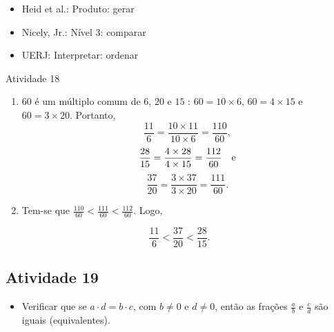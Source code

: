 \begin{multicols}{2}
   \vspace{.1cm}

 \vspace{.1cm}

\begin{itemize} %
    \item       Heid et al.: Produto: gerar
    \item       Nicely, Jr.: Nível 3: comparar
    \item       UERJ: Interpretar: ordenar
\end{itemize} %


\begin{resposta*}{Atividade 18}
\begin{enumerate} [\quad a)] %
    \item             $60$       é um múltiplo comum de       $6$,       $20$
   e       $15$      :       $60 = 10 \times 6$,       $60 = 4 \times 15$
e       $60 = 3 \times 20$. Portanto,       $$\frac{11}{6} = \frac{10 \times
11}{10 \times 6} = \frac{110}{60},$$             $$\frac{28}{15} = \frac{4
\times 28}{4 \times 15} = \frac{112}{60} \quad {\rm  e}$$
$$\frac{37}{20} = \frac{3 \times 37}{3 \times 20} = \frac{111}{60}.$$
\mbox{} \newline
    \item       Tem-se que       $\frac{110}{60} < \frac{111}{60} <
\frac{112}{60}$. Logo,
\end{enumerate} %

  $$\frac{11}{6} < \frac{37}{20} < \frac{28}{15}.$$
\end{resposta*}

\subsection{Atividade 19}

\begin{itemize} %
    \item       Verificar que se       $a \cdot d = b \cdot c$, com       $b
\not = 0$       e       $d \not = 0$, então as frações       $\frac{a}{b}$
e       $\frac{c}{d}$       são iguais (equivalentes).
\end{itemize} %




\end{multicols}
